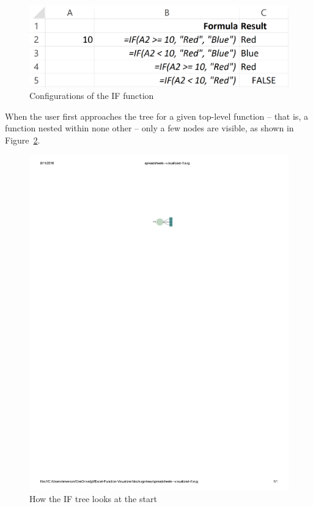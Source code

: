 \documentclass[conference]{IEEEtran}
\begin{document}
	\begin{figure}[h] \centering \includegraphics[width=\columnwidth]{ifExample}
		\caption{Configurations of the IF function} \label{fig:ifexample} \end{figure}
	
	When the user first approaches the tree for a given top-level function -- that
	is, a function nested within none other -- only a few nodes are visible, as
	shown in Figure~\ref{fig:startpic}. 
	
	\begin{figure}[h] \centering \includegraphics[width=.4\columnwidth]{start} \caption{How the
			IF tree looks at the start} \label{fig:startpic} \end{figure}
	
\end{document}
